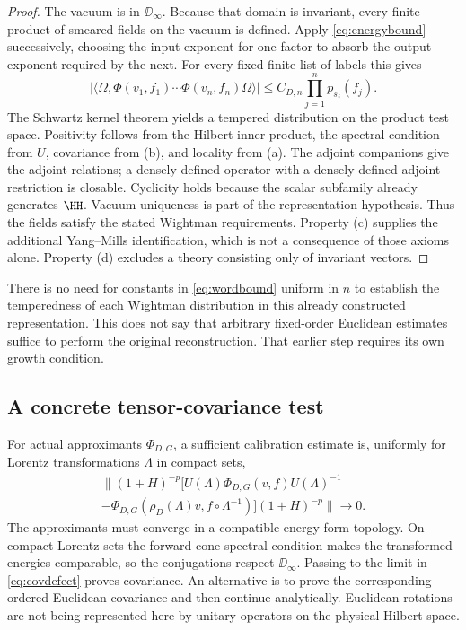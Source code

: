 \begin{proof}
The vacuum is in \(\DD_\infty\). Because that domain is invariant,
every finite product of smeared fields on the vacuum is defined.
Apply \eqref{eq:energybound} successively, choosing the input exponent
for one factor to absorb the output exponent required by the next.
For every fixed finite list of labels this gives
\begin{equation}
 |\langle\Omega,\Phi(v_1,f_1)\cdots\Phi(v_n,f_n)\Omega\rangle|
 \leq C_{D,n}\prod_{j=1}^n p_{s_j}(f_j). \label{eq:wordbound}
\end{equation}
The Schwartz kernel theorem yields a tempered distribution on the
product test space. Positivity follows from the Hilbert inner product,
the spectral condition from \(U\), covariance from (b), and locality
from (a). The adjoint companions give the adjoint relations; a densely
defined operator with a densely defined adjoint restriction is closable.
Cyclicity holds because the scalar subfamily already generates \(\HH\).
Vacuum uniqueness is part of the representation hypothesis. Thus the
fields satisfy the stated Wightman requirements. Property (c) supplies
the additional Yang--Mills identification, which is not a consequence
of those axioms alone. Property (d) excludes a theory consisting only of
invariant vectors.\end{proof}

There is no need for constants in \eqref{eq:wordbound} uniform in \(n\)
to establish the temperedness of each Wightman distribution in this
already constructed representation. This does not say that arbitrary
fixed-order Euclidean estimates suffice to perform the original
reconstruction. That earlier step requires its own growth condition.

\subsection{A concrete tensor-covariance test}

For actual approximants \(\Phi_{D,G}\), a sufficient calibration estimate
is, uniformly for Lorentz transformations \(\Lambda\) in compact sets,
\begin{multline}
 \big\|(1+H)^{-p}\big[
 U(\Lambda)\Phi_{D,G}(v,f)U(\Lambda)^{-1}\\
 -\Phi_{D,G}(\rho_D(\Lambda)v,f\circ\Lambda^{-1})
 \big](1+H)^{-p}\big\|\longrightarrow0. \label{eq:covdefect}
\end{multline}
The approximants must converge in a compatible energy-form topology.
On compact Lorentz sets the forward-cone spectral condition makes the
transformed energies comparable, so the conjugations respect
\(\DD_\infty\). Passing to the limit in \eqref{eq:covdefect} proves
covariance. An alternative is to prove the corresponding ordered
Euclidean covariance and then continue analytically. Euclidean rotations
are not being represented here by unitary operators on the physical
Hilbert space.

